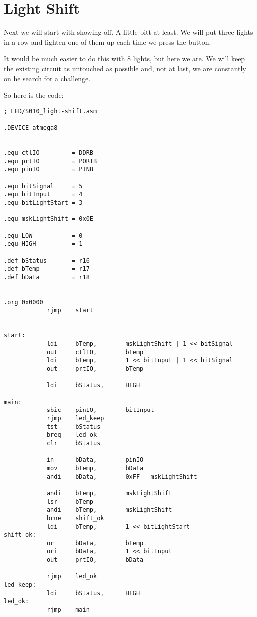 \section{Light Shift}

Next we will start with showing off. A little bitt at least. We will put three lights in a row and lighten one of them up each time we press the button.

It would be much easier to do this with 8 lights, but here we are. We will keep the existing circuit as untouched as possible and, not at last, we are constantly on he search for a challenge.

So here is the code:

\begin{lstlisting}
; LED/S010_light-shift.asm

.DEVICE atmega8


.equ ctlIO         = DDRB
.equ prtIO         = PORTB
.equ pinIO         = PINB

.equ bitSignal     = 5
.equ bitInput      = 4
.equ bitLightStart = 3

.equ mskLightShift = 0x0E

.equ LOW           = 0
.equ HIGH          = 1

.def bStatus       = r16
.def bTemp         = r17
.def bData         = r18


.org 0x0000
            rjmp    start


start:
            ldi     bTemp,        mskLightShift | 1 << bitSignal
            out     ctlIO,        bTemp
            ldi     bTemp,        1 << bitInput | 1 << bitSignal
            out     prtIO,        bTemp

            ldi     bStatus,      HIGH

main:
            sbic    pinIO,        bitInput
            rjmp    led_keep
            tst     bStatus
            breq    led_ok
            clr     bStatus

            in      bData,        pinIO
            mov     bTemp,        bData
            andi    bData,        0xFF - mskLightShift

            andi    bTemp,        mskLightShift
            lsr     bTemp
            andi    bTemp,        mskLightShift
            brne    shift_ok
            ldi     bTemp,        1 << bitLightStart
shift_ok:
            or      bData,        bTemp
            ori     bData,        1 << bitInput
            out     prtIO,        bData

            rjmp    led_ok
led_keep:
            ldi     bStatus,      HIGH
led_ok:
            rjmp    main
\end{lstlisting}
